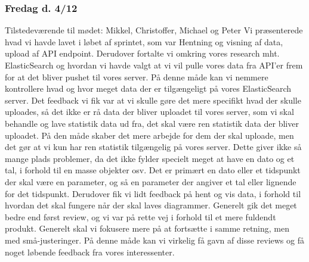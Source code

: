 \subsubsection{Fredag d. 4/12}
Tilstedeværende til mødet: Mikkel, Christoffer, Michael og Peter
Vi præsenterede hvad vi havde lavet i løbet af sprintet, som var Hentning og visning af data, upload af API endpoint. Derudover fortalte vi omkring vores research mht. ElasticSearch og hvordan vi havde valgt at vi vil pulle vores data fra API'er frem for at det bliver pushet til vores server. På denne måde kan vi nemmere kontrollere hvad og hvor meget data der er tilgængeligt på vores ElasticSearch server.
Det feedback vi fik var at vi skulle gøre det mere specifikt hvad der skulle uploades, så det ikke er rå data der bliver uploadet til vores server, som vi skal behandle og lave statistik data ud fra, det skal være ren statistik data der bliver uploadet. På den måde skaber det mere arbejde for dem der skal uploade, men det gør at vi kun har ren statistik tilgængelig på vores server. Dette giver ikke så mange plads problemer, da det ikke fylder specielt meget at have en dato og et tal, i forhold til en masse objekter osv. Det er primært en dato eller et tidspunkt der skal være en parameter, og så en parameter der angiver et tal eller lignende for det tidspunkt.
Derudover fik vi lidt feedback på hent og vis data, i forhold til hvordan det skal fungere når der skal laves diagrammer.
Generelt gik det meget bedre end først review, og vi var på rette vej i forhold til et mere fuldendt produkt. Generelt skal vi fokusere mere på at fortsætte i samme retning, men med små-justeringer. På denne måde kan vi virkelig få gavn af disse reviews og få noget løbende feedback fra vores interessenter.
